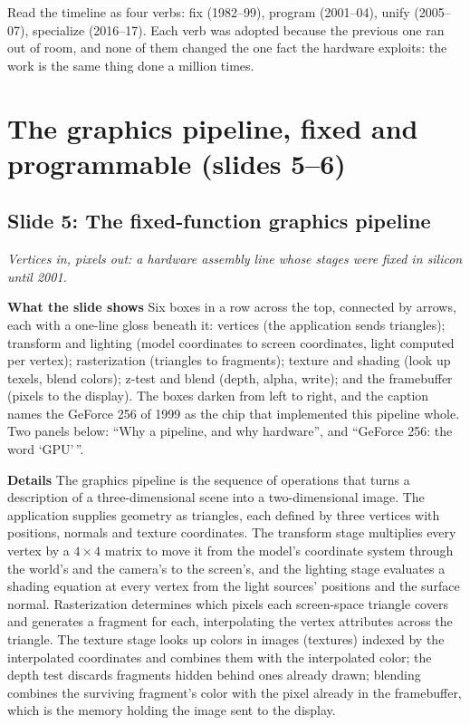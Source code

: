 \documentclass[11pt,letterpaper]{article}
\newcommand{\setstage}[1]{\colorlet{stagec}{#1}}
\newcommand{\slide}[3]{%
  \subsection[Slide #1: #2]{Slide #1: #2}%
  {\color{muted}\itshape #3\par}\medskip}
\newcommand{\para}[1]{\medskip\noindent\textbf{#1}\quad}
\newenvironment{intuition}{\begin{tcolorbox}[intuitionbox]}{\end{tcolorbox}}
\begin{document}
\begin{intuition}
Read the timeline as four verbs: fix (1982--99), program (2001--04), unify (2005--07), specialize (2016--17). Each verb was adopted because the previous one ran out of room, and none of them changed the one fact the hardware exploits: the work is the same thing done a million times.
\end{intuition}
\setstage{tok}
\section{The graphics pipeline, fixed and programmable (slides 5--6)}

\slide{5}{The fixed-function graphics pipeline}{Vertices in, pixels out: a hardware assembly line whose stages were fixed in silicon until 2001.}

\para{What the slide shows} Six boxes in a row across the top, connected by arrows, each with a one-line gloss beneath it: vertices (the application sends triangles); transform and lighting (model coordinates to screen coordinates, light computed per vertex); rasterization (triangles to fragments); texture and shading (look up texels, blend colors); z-test and blend (depth, alpha, write); and the framebuffer (pixels to the display). The boxes darken from left to right, and the caption names the GeForce 256 of 1999 as the chip that implemented this pipeline whole. Two panels below: ``Why a pipeline, and why hardware'', and ``GeForce 256: the word `GPU'\,''.

\para{Details} The graphics pipeline is the sequence of operations that turns a description of a three-dimensional scene into a two-dimensional image. The application supplies geometry as triangles, each defined by three vertices with positions, normals and texture coordinates. The transform stage multiplies every vertex by a $4\times4$ matrix to move it from the model's coordinate system through the world's and the camera's to the screen's, and the lighting stage evaluates a shading equation at every vertex from the light sources' positions and the surface normal. Rasterization determines which pixels each screen-space triangle covers and generates a fragment for each, interpolating the vertex attributes across the triangle. The texture stage looks up colors in images (textures) indexed by the interpolated coordinates and combines them with the interpolated color; the depth test discards fragments hidden behind ones already drawn; blending combines the surviving fragment's color with the pixel already in the framebuffer, which is the memory holding the image sent to the display.
\end{document}
